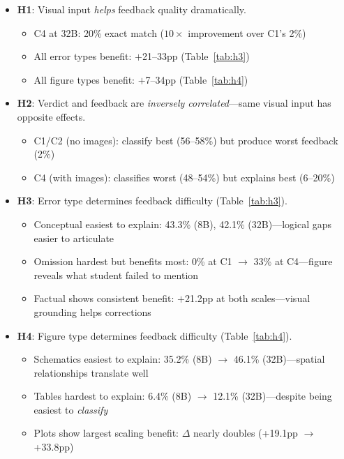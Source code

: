 \documentclass{article} %
\begin{document}
\begin{itemize}[itemsep=2pt, topsep=2pt]
    \item \textbf{H1}: Visual input \textit{helps} feedback quality dramatically.
    \begin{itemize}[itemsep=1pt, topsep=1pt]
        \item C4 at 32B: 20\% exact match ($10{\times}$ improvement over C1's 2\%)
        \item All error types benefit: $+$21--33pp (Table~\ref{tab:h3})
        \item All figure types benefit: $+$7--34pp (Table~\ref{tab:h4})
    \end{itemize}
    \item \textbf{H2}: Verdict and feedback are \textit{inversely correlated}---same visual input has opposite effects.
    \begin{itemize}[itemsep=1pt, topsep=1pt]
        \item C1/C2 (no images): classify best (56--58\%) but produce worst feedback (2\%)
        \item C4 (with images): classifies worst (48--54\%) but explains best (6--20\%)
    \end{itemize}
    \item \textbf{H3}: Error type determines feedback difficulty (Table~\ref{tab:h3}).
    \begin{itemize}[itemsep=1pt, topsep=1pt]
        \item Conceptual easiest to explain: 43.3\% (8B), 42.1\% (32B)---logical gaps easier to articulate
        \item Omission hardest but benefits most: 0\% at C1 $\to$ 33\% at C4---figure reveals what student failed to mention
        \item Factual shows consistent benefit: $+$21.2pp at both scales---visual grounding helps corrections
    \end{itemize}
    \item \textbf{H4}: Figure type determines feedback difficulty (Table~\ref{tab:h4}).
    \begin{itemize}[itemsep=1pt, topsep=1pt]
        \item Schematics easiest to explain: 35.2\% (8B) $\to$ 46.1\% (32B)---spatial relationships translate well
        \item Tables hardest to explain: 6.4\% (8B) $\to$ 12.1\% (32B)---despite being easiest to \textit{classify}
        \item Plots show largest scaling benefit: $\Delta$ nearly doubles (+19.1pp $\to$ +33.8pp)
    \end{itemize}
\end{itemize}
\end{document}
